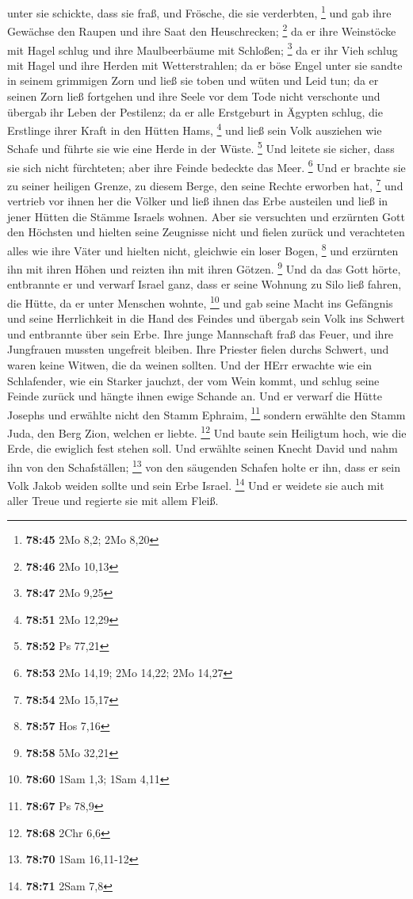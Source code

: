 unter sie schickte, dass sie fraß, und Frösche, die sie verderbten,
\footnote{\textbf{78:45} 2Mo 8,2; 2Mo 8,20}  und gab ihre
Gewächse den Raupen und ihre Saat den Heuschrecken; \footnote{\textbf{78:46}
  2Mo 10,13}  da er ihre Weinstöcke mit Hagel schlug und
ihre Maulbeerbäume mit Schloßen; \footnote{\textbf{78:47} 2Mo 9,25}
 da er ihr Vieh schlug mit Hagel und ihre Herden mit
Wetterstrahlen;  da er böse Engel unter sie sandte in
seinem grimmigen Zorn und ließ sie toben und wüten und Leid tun;
 da er seinen Zorn ließ fortgehen und ihre Seele vor dem
Tode nicht verschonte und übergab ihr Leben der Pestilenz;
 da er alle Erstgeburt in Ägypten schlug, die Erstlinge
ihrer Kraft in den Hütten Hams, \footnote{\textbf{78:51} 2Mo 12,29}
 und ließ sein Volk ausziehen wie Schafe und führte sie
wie eine Herde in der Wüste. \footnote{\textbf{78:52} Ps 77,21}
 Und leitete sie sicher, dass sie sich nicht fürchteten;
aber ihre Feinde bedeckte das Meer. \footnote{\textbf{78:53} 2Mo 14,19;
  2Mo 14,22; 2Mo 14,27}  Und er brachte sie zu seiner
heiligen Grenze, zu diesem Berge, den seine Rechte erworben hat,
\footnote{\textbf{78:54} 2Mo 15,17}  und vertrieb vor
ihnen her die Völker und ließ ihnen das Erbe austeilen und ließ in jener
Hütten die Stämme Israels wohnen.  Aber sie versuchten
und erzürnten Gott den Höchsten und hielten seine Zeugnisse nicht
 und fielen zurück und verachteten alles wie ihre Väter
und hielten nicht, gleichwie ein loser Bogen, \footnote{\textbf{78:57}
  Hos 7,16}  und erzürnten ihn mit ihren Höhen und
reizten ihn mit ihren Götzen. \footnote{\textbf{78:58} 5Mo 32,21}
 Und da das Gott hörte, entbrannte er und verwarf Israel
ganz,  dass er seine Wohnung zu Silo ließ fahren, die
Hütte, da er unter Menschen wohnte, \footnote{\textbf{78:60} 1Sam 1,3;
  1Sam 4,11}  und gab seine Macht ins Gefängnis und seine
Herrlichkeit in die Hand des Feindes  und übergab sein
Volk ins Schwert und entbrannte über sein Erbe.  Ihre
junge Mannschaft fraß das Feuer, und ihre Jungfrauen mussten ungefreit
bleiben.  Ihre Priester fielen durchs Schwert, und waren
keine Witwen, die da weinen sollten.  Und der HErr
erwachte wie ein Schlafender, wie ein Starker jauchzt, der vom Wein
kommt,  und schlug seine Feinde zurück und hängte ihnen
ewige Schande an.  Und er verwarf die Hütte Josephs und
erwählte nicht den Stamm Ephraim, \footnote{\textbf{78:67} Ps 78,9}
 sondern erwählte den Stamm Juda, den Berg Zion, welchen
er liebte. \footnote{\textbf{78:68} 2Chr 6,6}  Und baute
sein Heiligtum hoch, wie die Erde, die ewiglich fest stehen soll.
 Und erwählte seinen Knecht David und nahm ihn von den
Schafställen; \footnote{\textbf{78:70} 1Sam 16,11-12} 
von den säugenden Schafen holte er ihn, dass er sein Volk Jakob weiden
sollte und sein Erbe Israel. \footnote{\textbf{78:71} 2Sam 7,8}
 Und er weidete sie auch mit aller Treue und regierte sie
mit allem Fleiß.

